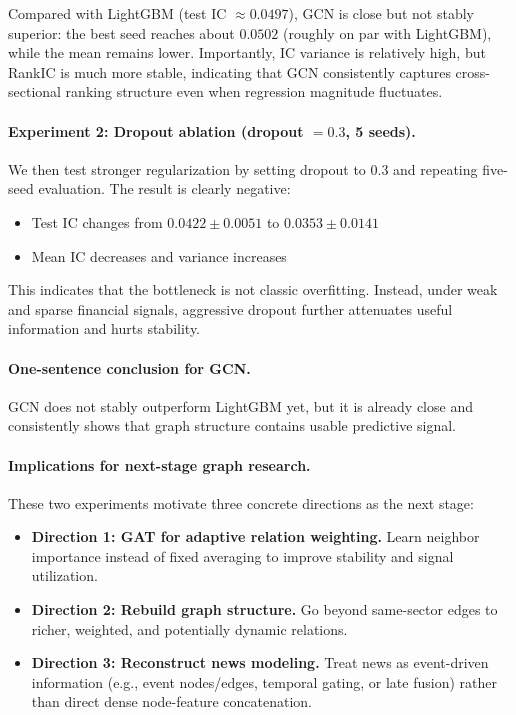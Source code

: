 Compared with LightGBM (test IC $\approx 0.0497$), GCN is close but not stably superior: the best seed reaches about $0.0502$ (roughly on par with LightGBM), while the mean remains lower. Importantly, IC variance is relatively high, but RankIC is much more stable, indicating that GCN consistently captures cross-sectional ranking structure even when regression magnitude fluctuates.

\paragraph{Experiment 2: Dropout ablation (dropout $=0.3$, 5 seeds).}
We then test stronger regularization by setting dropout to 0.3 and repeating five-seed evaluation. The result is clearly negative:
\begin{itemize}
\item Test IC changes from $0.0422 \pm 0.0051$ to $0.0353 \pm 0.0141$
\item Mean IC decreases and variance increases
\end{itemize}

This indicates that the bottleneck is not classic overfitting. Instead, under weak and sparse financial signals, aggressive dropout further attenuates useful information and hurts stability.

\paragraph{One-sentence conclusion for GCN.}
GCN does not stably outperform LightGBM yet, but it is already close and consistently shows that graph structure contains usable predictive signal.

\paragraph{Implications for next-stage graph research.}
These two experiments motivate three concrete directions as the next stage:
\begin{itemize}
\item \textbf{Direction 1: GAT for adaptive relation weighting.} Learn neighbor importance instead of fixed averaging to improve stability and signal utilization.
\item \textbf{Direction 2: Rebuild graph structure.} Go beyond same-sector edges to richer, weighted, and potentially dynamic relations.
\item \textbf{Direction 3: Reconstruct news modeling.} Treat news as event-driven information (e.g., event nodes/edges, temporal gating, or late fusion) rather than direct dense node-feature concatenation.
\end{itemize}

